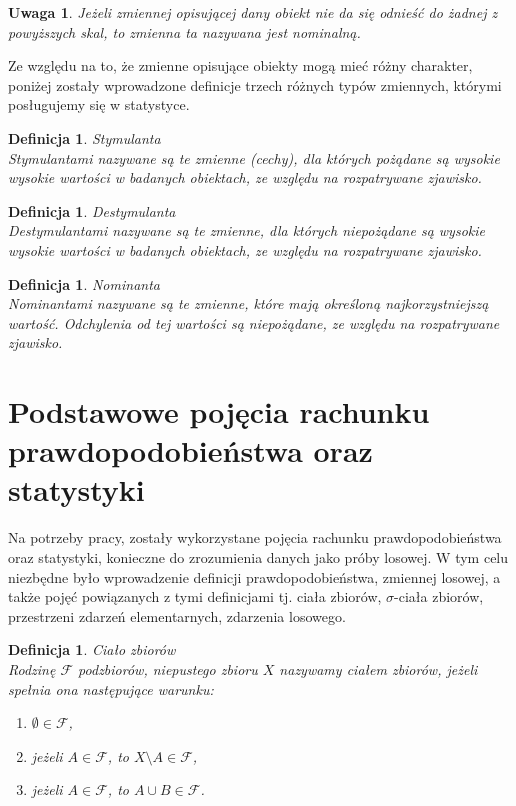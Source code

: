 \documentclass[12pt,a4paper]{report}
\newtheorem{definition}[theorem]{Definicja}
\newtheorem{uwaga}{Uwaga}
\begin{document}
\begin{uwaga}
Jeżeli zmiennej opisującej dany obiekt nie da się odnieść do żadnej z powyższych skal, to zmienna ta nazywana jest nominalną.
\end{uwaga}

Ze względu na to, że zmienne opisujące obiekty mogą mieć różny charakter, poniżej zostały wprowadzone definicje trzech różnych typów zmiennych, którymi posługujemy się w statystyce. 

\begin{definition}{Stymulanta \cite[Rozdział 1.5]{panek2013}}\\
Stymulantami nazywane są te zmienne (cechy), dla których pożądane są wysokie wysokie wartości w badanych obiektach, ze względu na rozpatrywane zjawisko. 
\end{definition}

\begin{definition}{Destymulanta \cite[Rozdział 1.5]{panek2013}}\\
Destymulantami nazywane są te  zmienne, dla których niepożądane są wysokie wysokie wartości w badanych obiektach, ze względu na rozpatrywane zjawisko. 
\end{definition}

\begin{definition}{Nominanta \cite[Rozdział 1.5]{panek2013}}\\
Nominantami nazywane są te zmienne, które mają określoną najkorzystniejszą wartość. Odchylenia od tej wartości są niepożądane, ze względu na rozpatrywane zjawisko. 
\end{definition}



\section{Podstawowe pojęcia rachunku prawdopodobieństwa oraz statystyki} \label{rachunek prawdopodobienstwa}


Na potrzeby pracy, zostały wykorzystane pojęcia rachunku prawdopodobieństwa oraz statystyki, konieczne do zrozumienia danych jako próby losowej. W tym celu niezbędne było wprowadzenie definicji prawdopodobieństwa, zmiennej losowej, a także pojęć powiązanych z tymi definicjami tj. ciała zbiorów, $\sigma$-ciała zbiorów, przestrzeni zdarzeń elementarnych, zdarzenia losowego.


\begin{definition}{Ciało zbiorów \cite[Rozdział 8.1]{rudnicki2006}}\\
Rodzinę $\mathcal{F}$ podzbiorów, niepustego zbioru $X$ nazywamy ciałem zbiorów, jeżeli spełnia ona następujące warunku: 
\begin{enumerate}
\item $\emptyset \in \mathcal{F}$,
\item jeżeli $A \in \mathcal{F}$, to $X \setminus A \in \mathcal{F}$,
\item jeżeli $A \in \mathcal{F}$, to $A \cup B \in \mathcal{F}$.
\end{enumerate}
\end{definition}
\end{document}
